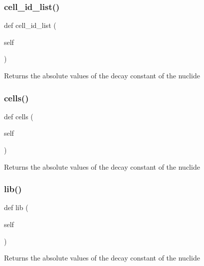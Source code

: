 \subsubsection{\texorpdfstring{cell\+\_\+id\+\_\+list()}{cell\_id\_list()}}
{\footnotesize\ttfamily def cell\+\_\+id\+\_\+list (\begin{DoxyParamCaption}\item[{}]{self }\end{DoxyParamCaption})}

\begin{DoxyVerb}Returns the absolute values of the decay constant of the nuclide\end{DoxyVerb}
 \mbox{\label{classopenbu_1_1input_1_1_input_ada83a03c99c1587bee0ffb75e04f0589}} 
\subsubsection{\texorpdfstring{cells()}{cells()}}
{\footnotesize\ttfamily def cells (\begin{DoxyParamCaption}\item[{}]{self }\end{DoxyParamCaption})}

\begin{DoxyVerb}Returns the absolute values of the decay constant of the nuclide\end{DoxyVerb}
 \mbox{\label{classopenbu_1_1input_1_1_input_a7c74249450d6c2107885b03f5328ca75}} 
\subsubsection{\texorpdfstring{lib()}{lib()}}
{\footnotesize\ttfamily def lib (\begin{DoxyParamCaption}\item[{}]{self }\end{DoxyParamCaption})}

\begin{DoxyVerb}Returns the absolute values of the decay constant of the nuclide\end{DoxyVerb}
 \mbox{\label{classopenbu_1_1input_1_1_input_a6ef2947c0b15938b4f351065ee10dcc9}} 
